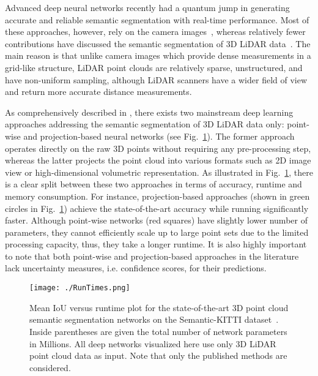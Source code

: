 \documentclass[letterpaper, 10 pt, conference]{ieeeconf}
\makeatletter
\def\ie{i.e.\@\xspace}
\makeatother
\begin{document}
Advanced deep neural networks recently had a quantum jump in generating accurate and reliable semantic segmentation with real-time performance. Most of these approaches, however, rely on the camera images~\cite{kendall2015bayesian,FastSCNN2019}, whereas relatively fewer contributions have discussed the semantic segmentation of 3D LiDAR data~\cite{SqueezesegV01,rangenetpp}. The main reason is that unlike camera images  which provide dense measurements in a grid-like structure,   LiDAR point clouds are relatively sparse, unstructured, and have non-uniform sampling, although LiDAR scanners have a wider field of view and return more accurate distance measurements. 

As comprehensively described in \cite{survey3DPC2019}, there exists two mainstream deep learning  approaches addressing the semantic segmentation of 3D LiDAR data only: point-wise and projection-based neural networks (see Fig.~\ref{fig:meanIoUvsRunTime}). The former approach operates directly on the raw 3D points   without requiring any pre-processing step,  whereas the latter projects the point cloud into various formats such as 2D image view or high-dimensional volumetric representation. As illustrated in Fig.~\ref{fig:meanIoUvsRunTime}, there is a clear split between these two approaches in terms of accuracy, runtime and memory consumption. 
For instance, projection-based approaches (shown in green circles in Fig.~\ref{fig:meanIoUvsRunTime}) achieve the state-of-the-art accuracy while running significantly faster. Although point-wise networks (red squares) have slightly lower number of parameters, they  cannot   efficiently scale up to large point sets due to the limited processing capacity, thus, they take a longer runtime. 
It is also highly important to note that  both  point-wise and projection-based approaches in the literature  lack  uncertainty measures, \ie confidence scores, for their predictions.

 
\begin{figure}[!t]
    \centering
    \texttt{[image: ./RunTimes.png]}
    \caption{Mean IoU versus runtime plot for the state-of-the-art 3D point cloud semantic segmentation networks on the Semantic-KITTI dataset~\cite{semantickitti}. Inside parentheses are given the total number of network parameters in Millions. All deep networks visualized here use only 3D LiDAR point cloud data as input.   Note that only the published methods  are considered. }
    \label{fig:meanIoUvsRunTime}
\end{figure}
\end{document}
